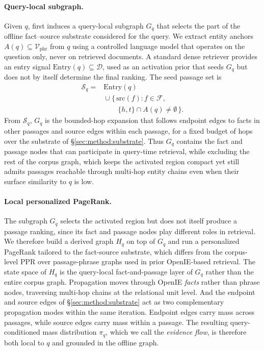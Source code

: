 \paragraph{Query-local subgraph.}
Given $q$, \methodname{} first induces a query-local subgraph $G_q$ that
selects the part of the offline fact--source substrate considered for
the query. We extract entity anchors
$A(q) \subseteq \mathcal{V}_{\mathrm{phr}}$ from $q$ using a controlled
language model that operates on the question only, never on retrieved
documents. A standard dense retriever provides an entry signal
$\mathrm{Entry}(q) \subseteq \mathcal{D}$, used as an activation prior
that seeds $G_q$ but does not by itself determine the final ranking.
The seed passage set is
\begin{equation}
\label{eq:gq-seed}
\begin{aligned}
\mathcal{S}_q
= {}& \mathrm{Entry}(q) \\
& {}\cup
\{\,\mathrm{src}(f) : f\in\mathcal{F},\\
&\qquad \{h,t\}\cap A(q)\neq\emptyset\,\}.
\end{aligned}
\end{equation}
From $\mathcal{S}_q$, $G_q$ is the bounded-hop expansion that follows
endpoint edges to facts in other passages and source edges within
each passage, for a fixed budget of hops over the substrate of
\S\ref{sec:method:substrate}. Thus $G_q$ contains the fact and passage
nodes that can participate in query-time retrieval, while excluding
the rest of the corpus graph, which keeps the activated region compact
yet still admits passages reachable through multi-hop entity chains
even when their surface similarity to $q$ is low.

\paragraph{Local personalized PageRank.}
The subgraph $G_q$ selects the activated region but does not itself
produce a passage ranking, since its fact and passage nodes play
different roles in retrieval. We therefore build a derived graph
$H_q$ on top of $G_q$ and run a personalized PageRank tailored to
the fact-source substrate, which differs from the corpus-level PPR
over passage-phrase graphs used in prior OpenIE-based retrieval.
The state space of $H_q$ is the query-local fact-and-passage layer
of $G_q$ rather than the entire corpus graph. Propagation moves
through OpenIE \emph{facts} rather than phrase nodes, traversing
multi-hop chains at the relational unit level. And the endpoint and
source edges of \S\ref{sec:method:substrate} act as two complementary
propagation modes within the same iteration. Endpoint edges carry
mass across passages, while source edges carry mass within a passage.
The resulting query-conditioned mass distribution $\pi_q$, which we
call the \emph{evidence flow}, is therefore both local to $q$ and
grounded in the offline graph.

